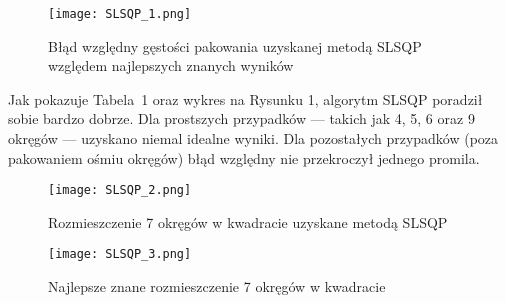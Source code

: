\documentclass{article}
\begin{document}
\begin{table}[ht]
\centering
{}
\caption{Porównanie wyników gęstości dla metody SLSQP oraz najlepszych znanych wartości}
\end{table}

\begin{figure}[H]
    \centering
    \texttt{[image: SLSQP\_1.png]}
    \caption{Błąd względny gęstości pakowania uzyskanej metodą SLSQP względem najlepszych znanych wyników}
    \label{fig:slsqp-error}
\end{figure}

Jak pokazuje Tabela~1 oraz wykres na Rysunku 1, algorytm SLSQP poradził sobie bardzo dobrze. Dla prostszych przypadków — takich jak 4, 5, 6 oraz 9 okręgów — uzyskano niemal idealne wyniki. Dla pozostałych przypadków (poza pakowaniem ośmiu okręgów) błąd względny nie przekroczył jednego promila.

\begin{figure}[H]
    \centering
    \begin{minipage}{0.59\linewidth}
        \texttt{[image: SLSQP\_2.png]}
        \caption{Rozmieszczenie 7 okręgów w kwadracie uzyskane metodą SLSQP}
        \label{fig:slsqp-layout}
    \end{minipage}
    \hfill
    \begin{minipage}{0.4\linewidth}
        \texttt{[image: SLSQP\_3.png]}
        \caption{Najlepsze znane rozmieszczenie 7 okręgów w kwadracie}
        \label{fig:best-layout}
    \end{minipage}
\end{figure}
\end{document}
